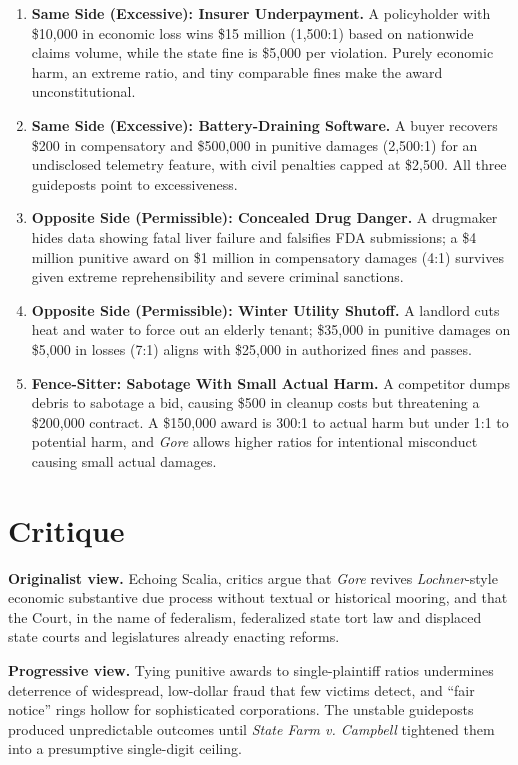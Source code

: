 \documentclass[12pt]{article}
\begin{document}
\begin{enumerate}
\item \textbf{Same Side (Excessive): Insurer Underpayment.} A policyholder with \$10,000 in economic loss wins \$15 million (1,500:1) based on nationwide claims volume, while the state fine is \$5,000 per violation. Purely economic harm, an extreme ratio, and tiny comparable fines make the award unconstitutional.
\item \textbf{Same Side (Excessive): Battery-Draining Software.} A buyer recovers \$200 in compensatory and \$500,000 in punitive damages (2,500:1) for an undisclosed telemetry feature, with civil penalties capped at \$2,500. All three guideposts point to excessiveness.
\item \textbf{Opposite Side (Permissible): Concealed Drug Danger.} A drugmaker hides data showing fatal liver failure and falsifies FDA submissions; a \$4 million punitive award on \$1 million in compensatory damages (4:1) survives given extreme reprehensibility and severe criminal sanctions.
\item \textbf{Opposite Side (Permissible): Winter Utility Shutoff.} A landlord cuts heat and water to force out an elderly tenant; \$35,000 in punitive damages on \$5,000 in losses (7:1) aligns with \$25,000 in authorized fines and passes.
\item \textbf{Fence-Sitter: Sabotage With Small Actual Harm.} A competitor dumps debris to sabotage a bid, causing \$500 in cleanup costs but threatening a \$200,000 contract. A \$150,000 award is 300:1 to actual harm but under 1:1 to potential harm, and \textit{Gore} allows higher ratios for intentional misconduct causing small actual damages.
\end{enumerate}

\section{Critique}

\textbf{Originalist view.} Echoing Scalia, critics argue that \textit{Gore} revives \textit{Lochner}-style economic substantive due process without textual or historical mooring, and that the Court, in the name of federalism, federalized state tort law and displaced state courts and legislatures already enacting reforms.

\textbf{Progressive view.} Tying punitive awards to single-plaintiff ratios undermines deterrence of widespread, low-dollar fraud that few victims detect, and ``fair notice'' rings hollow for sophisticated corporations. The unstable guideposts produced unpredictable outcomes until \textit{State Farm v. Campbell} tightened them into a presumptive single-digit ceiling.
\end{document}
